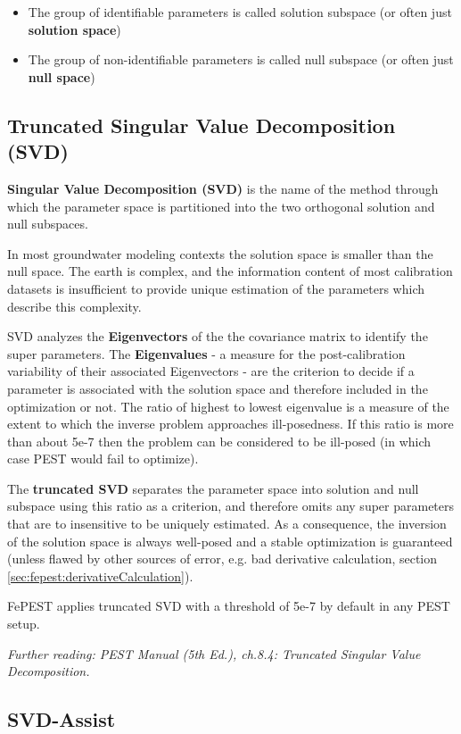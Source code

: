 \begin{itemize}
\item	The group of identifiable parameters is called solution subspace (or often just \textbf{solution space})
\item	The group of non-identifiable parameters is called null subspace (or often just \textbf{null space})
\end{itemize}

\subsection{Truncated Singular Value Decomposition (SVD)}
\textbf{Singular Value Decomposition (SVD)} is the name of the method through which the parameter space is partitioned into the two orthogonal solution and null subspaces.

In most groundwater modeling contexts the solution space is smaller than the null space. The earth is complex, and the information content of most calibration datasets is insufficient to provide unique estimation of the parameters which describe this complexity.

SVD analyzes the \textbf{Eigenvectors} of the the covariance matrix to identify the super parameters. The \textbf{Eigenvalues} - a  measure for the post-calibration variability of their associated Eigenvectors - are the criterion to decide if a parameter is associated with the solution space and therefore included in the optimization or not. 
The ratio of highest to lowest eigenvalue is a measure of the extent to which the inverse problem approaches ill-posedness. If this ratio is more than about 5e-7 then the problem can be considered to be ill-posed (in which case PEST would fail to optimize).

The \textbf{truncated SVD} separates the parameter space into solution and null subspace using this ratio as a criterion, and therefore omits any super parameters that are to insensitive to be uniquely estimated. As a consequence, the inversion of the solution space is always well-posed and a stable optimization is guaranteed (unless flawed by other sources of error, e.g. bad derivative calculation, section \ref{sec:fepest:derivativeCalculation}).

FePEST applies truncated SVD with a threshold of 5e-7 by default in any PEST setup.

\textit{Further reading: PEST Manual (5th Ed.), ch.8.4: Truncated Singular Value Decomposition.}

\subsection{SVD-Assist}

